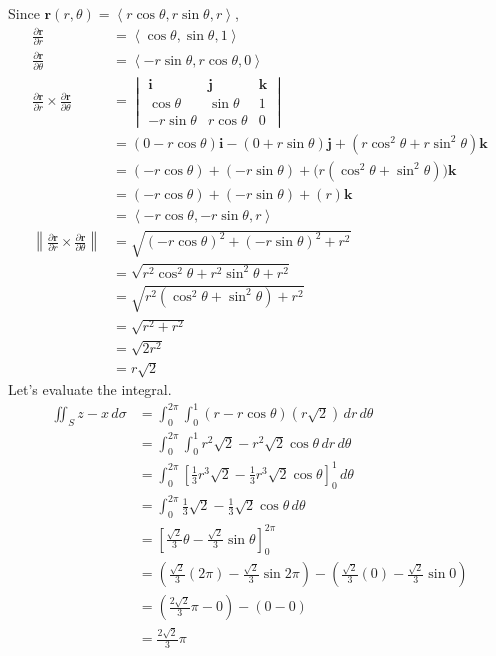 \documentclass{article}
\newcommand{\lrp}[1]{\left( #1 \right)}
\newcommand{\lra}[1]{\left\langle #1 \right\rangle}
\newcommand{\lrb}[1]{\left[ #1 \right]}
\newcommand{\norm}[1]{\left\lVert #1 \right\rVert}
\renewcommand{\i}[0]{\mathbf{i}}
\renewcommand{\j}[0]{\mathbf{j}}
\renewcommand{\k}[0]{\mathbf{k}}
\renewcommand{\r}[0]{\mathbf{r}}
\begin{document}
Since $ \r(r,\theta)=\lra{r\cos\theta, r\sin\theta, r}$,
\begin{align*}
    \frac{\partial \r}{\partial r}&=\lra{\cos\theta, \sin\theta, 1}\\
    \frac{\partial \r}{\partial \theta}&=\lra{-r\sin\theta, r\cos\theta, 0}\\
    \frac{\partial \r}{\partial r}\times \frac{\partial \r}{\partial \theta}&=\begin{vmatrix}\i & \j & \k\\ \cos\theta & \sin\theta & 1\\
    -r\sin\theta & r\cos\theta & 0\end{vmatrix}\\
    &=\lrp{0-r\cos\theta}\i - \lrp{0+r\sin\theta}\j + \lrp{r\cos^2\theta+r\sin^2\theta}\k\\
    &=\lrp{-r\cos\theta}+\lrp{-r\sin\theta}+\big(r\lrp{\cos^2\theta+\sin^2\theta}\big)\k\\
    &=\lrp{-r\cos\theta}+\lrp{-r\sin\theta}+\lrp{r}\k\tag{$\cos^2\theta+\sin^2\theta=1$}\\
    &=\lra{-r\cos\theta, -r\sin\theta, r}\\
    \norm{\frac{\partial \r}{\partial r}\times \frac{\partial \r}{\partial \theta}}&=\sqrt{\lrp{-r\cos\theta}^2+\lrp{-r\sin\theta}^2+r^2}\\
    &=\sqrt{r^2\cos^2\theta+r^2\sin^2\theta+r^2}\\
    &=\sqrt{r^2\lrp{\cos^2\theta+\sin^2\theta}+r^2}\\
    &=\sqrt{r^2+r^2}\tag{$\cos^2\theta+\sin^2\theta=1$}\\
    &=\sqrt{2r^2}\\
    &=r\sqrt{2}
\end{align*}
Let's evaluate the integral.
\begin{align*}
    \iint_S z-x\,d\sigma&=\int_0^{2\pi}\int_0^1 \lrp{r-r\cos\theta}\lrp{r\sqrt{2}}\,dr\,d\theta\\
    &=\int_0^{2\pi}\int_0^1 r^2\sqrt{2}-r^2\sqrt{2}\cos\theta\,dr\,d\theta\\
    &=\int_0^{2\pi}\lrb{\frac{1}{3}r^3\sqrt{2}-\frac{1}{3}r^3\sqrt{2}\cos\theta}_0^1\,d\theta\\
    &=\int_0^{2\pi}\frac{1}{3}\sqrt{2}-\frac{1}{3}\sqrt{2}\cos\theta\,d\theta\\
    &=\lrb{\frac{\sqrt{2}}{3}\theta-\frac{\sqrt{2}}{3}\sin\theta}_0^{2\pi}\\
    &=\lrp{\frac{\sqrt{2}}{3}\lrp{2\pi}-\frac{\sqrt{2}}{3}\sin 2\pi}-\lrp{\frac{\sqrt{2}}{3}(0)-\frac{\sqrt{2}}{3}\sin 0}\\
    &=\lrp{\frac{2\sqrt{2}}{3}\pi - 0}-\lrp{0-0}\\
    &=\boxed{\frac{2\sqrt{2}}{3}\pi}
\end{align*}
\end{document}
